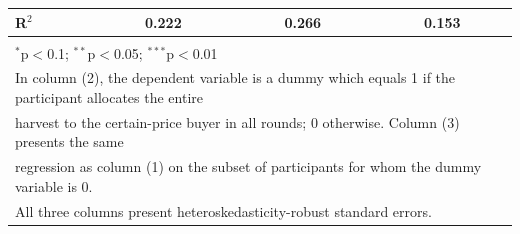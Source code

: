 \begin{table}[!htbp]
\begin{tabular}{@{\extracolsep{5pt}}lccc}
R$^{2}$ & 0.222 & 0.266 & 0.153 \\ 
\hline 
\hline \\[-1.8ex] 
\multicolumn{4}{l}{$^{*}$p$<$0.1; $^{**}$p$<$0.05; $^{***}$p$<$0.01} \\ 
\multicolumn{4}{l}{In column (2), the dependent variable is a dummy which equals 1 if the participant allocates the entire} \\ 
\multicolumn{4}{l}{harvest to the certain-price buyer in all rounds; 0 otherwise. Column (3) presents the same} \\ 
\multicolumn{4}{l}{regression as column (1) on the subset of participants for whom the dummy variable is 0.} \\ 
\multicolumn{4}{l}{All three columns present heteroskedasticity-robust standard errors.} \\ 
\end{tabular} 
\end{table} 
